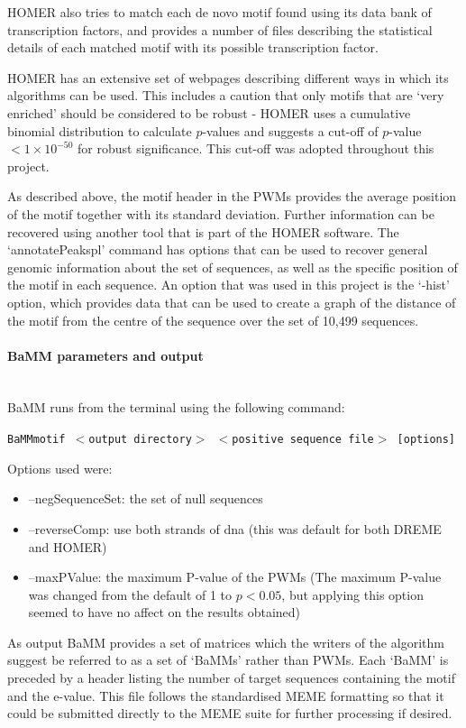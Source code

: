 \documentclass[12pt]{article}
\begin{document}
HOMER also tries to match each de novo motif found using its data bank of transcription factors, and provides a number of files describing the statistical details of each matched motif with its possible transcription factor.

HOMER has an extensive set of webpages describing different ways in which its algorithms can be used. This includes a caution that only motifs that are `very enriched' should be considered to be robust - HOMER uses a cumulative binomial distribution to calculate $p$-values and suggests a cut-off of $p$-value $ <1\times10^{-50}$ for robust significance. This cut-off was adopted throughout this project. 

As described above, the motif header in the PWMs provides the average position of the motif together with its standard deviation. Further information can be recovered using another tool that is part of the HOMER software. The `annotatePeakspl' command has options that can be used to recover general genomic information about the set of sequences, as well as the specific position of the motif in each sequence. An option that was used in this project is the `-hist' option, which provides data that can be used to create a graph of the distance of the motif from the centre of the sequence over the set of 10,499 sequences.

\paragraph{BaMM parameters and output}\mbox{}\\
BaMM runs from the terminal using the following command:

\texttt{BaMMmotif $<$output directory$>$ $<$positive sequence file$>$ [options]}

Options used were:
\begin{itemize}
\item --negSequenceSet: the set of null sequences
\item --reverseComp: use both strands of dna (this was default for both DREME and HOMER)
\item --maxPValue: the maximum P-value of the PWMs (The maximum P-value was changed from the default of 1 to $p<0.05$, but applying this option seemed to have no affect on the results obtained)
\end{itemize}

As output BaMM provides a set of matrices which the writers of the algorithm suggest be referred to as a set of `BaMMs' rather than PWMs. Each `BaMM' is preceded by a header listing the number of target sequences containing the motif and the e-value. This file follows the standardised MEME formatting so that it could be submitted directly to the MEME suite for further processing if desired.
\end{document}
